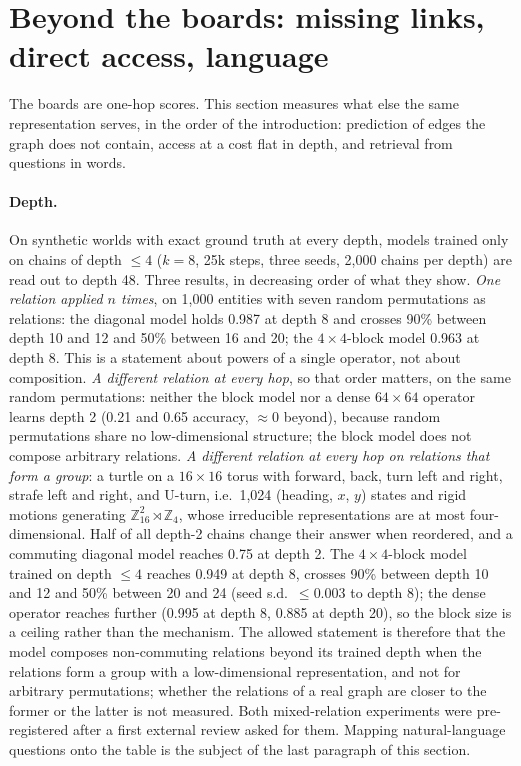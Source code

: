 \documentclass[11pt,a4paper]{article}
\begin{document}
\section{Beyond the boards: missing links, direct access, language}
\label{sec:beyond}

The boards are one-hop scores. This section measures what else the same
representation serves, in the order of the introduction: prediction of edges the
graph does not contain, access at a cost flat in depth, and retrieval
from questions in words.

\paragraph{Depth.} On synthetic worlds with exact ground truth at every
depth, models trained only on chains of depth $\le4$ ($k=8$, 25k steps,
three seeds, 2{,}000 chains per depth) are read out to depth 48. Three
results, in decreasing order of what they show. \emph{One relation
applied $n$ times}, on 1{,}000 entities with seven random permutations
as relations: the diagonal model holds 0.987 at depth 8 and crosses 90\%
between depth 10 and 12 and 50\% between 16 and 20; the $4\times4$-block
model 0.963 at depth 8. This is a statement about powers of a single
operator, not about composition. \emph{A different relation at every
hop}, so that order matters, on the same random permutations: neither the
block model nor a dense $64\times64$ operator learns depth 2 (0.21 and
0.65 accuracy, $\approx0$ beyond), because random permutations share no
low-dimensional structure; the block model does not compose arbitrary
relations. \emph{A different relation at every hop on relations that
form a group}: a turtle on a $16\times16$ torus with forward, back, turn
left and right, strafe left and right, and U-turn, i.e.\ 1{,}024
(heading, $x$, $y$) states and rigid motions generating
$\mathbb{Z}_{16}^2\rtimes\mathbb{Z}_4$, whose irreducible representations
are at most four-dimensional. Half of all depth-2 chains change their
answer when reordered, and a commuting diagonal model reaches 0.75 at
depth 2. The $4\times4$-block model trained on depth $\le4$ reaches 0.949
at depth 8, crosses 90\% between depth 10 and 12 and 50\% between 20 and
24 (seed s.d.\ $\le0.003$ to depth 8); the dense operator reaches
further (0.995 at depth 8, 0.885 at depth 20), so the block size is a
ceiling rather than the mechanism. The allowed statement is therefore
that the model composes non-commuting relations beyond its trained depth
when the relations form a group with a low-dimensional representation,
and not for arbitrary permutations; whether the relations of a real
graph are closer to the former or the latter is not measured. Both
mixed-relation experiments were pre-registered after a first external
review asked for them. Mapping natural-language questions onto the
table is the subject of the last paragraph of this section.
\end{document}
